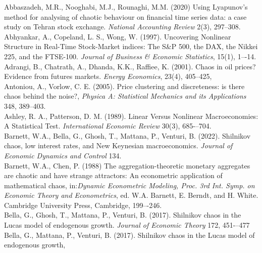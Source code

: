 \documentclass[12pt]{article}
\begin{document}
\noindent Abbaszadeh, M.R., Nooghabi, M.J., Rounaghi, M.M. (2020) Using Lyapunov's method for analysing of chaotic behaviour on financial time series data: a case study on Tehran stock exchange. \emph{National Accounting Review} 2(3), 297--308.
\newline{}\\
\noindent Abhyankar, A., Copeland, L. S., Wong, W. (1997). Uncovering Nonlinear Structure in Real-Time Stock-Market indices: The S\&P 500, the DAX, the Nikkei 225, and the FTSE-100. \emph{Journal of Business \& Economic Statistics}, 15(1), 1–-14.
\newline{}\\
\noindent Adrangi, B., Chatrath, A., Dhanda, K.K., Raffiee, K. (2001).
Chaos in oil prices? Evidence from futures markets. \emph{Energy Economics}, 23(4), 405--425,
\newline{}\\
\noindent Antoniou, A., Vorlow, C. E. (2005). Price clustering and discreteness: is there chaos behind the noise?,
\emph{Physica A: Statistical Mechanics and its Applications} 348, 389--403.
\newline{}\\
\noindent Ashley, R. A., Patterson, D. M. (1989). Linear Versus Nonlinear Macroeconomies: A Statistical Test. \emph{International Economic Review} 30(3), 685-–704.
\newline{}\\
\noindent Barnett, W.A., Bella, G., Ghosh, T., Mattana, P., Venturi, B. (2022). Shilnikov chaos, low interest rates, and New Keynesian macroeconomics.
\emph{Journal of Economic Dynamics and Control} 134.  
\newline{}\\
\noindent Barnett, W.A., Chen, P. (1988) The aggregation-theoretic monetary aggregates are chaotic and have strange attractors: An econometric application of mathematical chaos, in:\emph{Dynamic Econometric Modeling, Proc. 3rd Int. Symp. on Economic Theory and Econometrics}, ed. W.A. Barnett, E. Berndt, and H. White. Cambridge University Press, Cambridge, 199–-246.
\newline{}\\
\noindent Bella, G., Ghosh, T., Mattana, P., Venturi, B. (2017). Shilnikov chaos in the Lucas model of endogenous growth.
\emph{Journal of Economic Theory} 172, 451-–477 
\newline{}\\
\noindent Bella, G., Mattana, P., Venturi, B. (2017). Shilnikov chaos in the Lucas model of endogenous growth,
\end{document}
